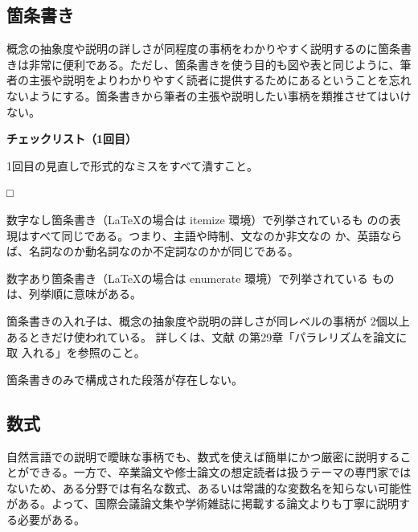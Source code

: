 \documentclass[11pt,a4j]{jsarticle}
\begin{document}
\subsection{箇条書き}

概念の抽象度や説明の詳しさが同程度の事柄をわかりやすく説明するのに箇条書
きは非常に便利である。ただし、箇条書きを使う目的も図や表と同じように、筆
者の主張や説明をよりわかりやすく読者に提供するためにあるということを忘れ
ないようにする。箇条書きから筆者の主張や説明したい事柄を類推させてはいけ
ない。

\begin{flushleft}
 {\bf チェックリスト（1回目）}
\end{flushleft}
1回目の見直しで形式的なミスをすべて潰すこと。
\begin{list}%
 {□} %
 {} %
 \item 数字なし箇条書き（LaTeXの場合は itemize 環境）で列挙されているも
       のの表現はすべて同じである。つまり、主語や時制、文なのか非文なの
       か、英語ならば、名詞なのか動名詞なのか不定詞なのかが同じである。
 \item 数字あり箇条書き（LaTeXの場合は enumerate 環境）で列挙されている
       ものは、列挙順に意味がある。
 \item 箇条書きの入れ子は、概念の抽象度や説明の詳しさが同レベルの事柄が
       2個以上あるときだけ使われている。 詳しくは、文献
       \cite{R.M.Lewis_HowToWrite_Ja_04}の第29章「パラレリズムを論文に取
       入れる」を参照のこと。
 \item 箇条書きのみで構成された段落が存在しない。
\end{list}

\subsection{数式}

自然言語での説明で曖昧な事柄でも、数式を使えば簡単にかつ厳密に説明するこ
とができる。一方で、卒業論文や修士論文の想定読者は扱うテーマの専門家では
ないため、ある分野では有名な数式、あるいは常識的な変数名を知らない可能性
がある。よって、国際会議論文集や学術雑誌に掲載する論文よりも丁寧に説明す
る必要がある。
\end{document}
